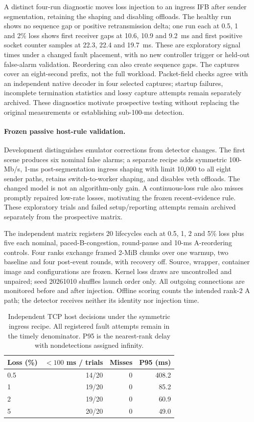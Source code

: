 \documentclass[sigconf]{acmart}
\begin{document}
A distinct four-run diagnostic moves loss injection to an ingress IFB
after sender segmentation, retaining the shaping and disabling offloads.
The healthy run shows no sequence gap or positive retransmission delta;
one run each at 0.5, 1 and 2\% loss shows first receiver gaps at
10.6, 10.9 and 9.2~ms and first positive socket counter samples at
22.3, 22.4 and 19.7~ms. These are exploratory signal times under a
changed fault placement, with no new controller trigger or held-out
false-alarm validation. Reordering can also create sequence gaps.
The captures cover an eight-second prefix, not the full workload.
Packet-field checks agree with an independent native decoder in four
selected captures; startup failures, incomplete termination statistics
and lossy capture attempts remain separately archived. These diagnostics
motivate prospective testing without replacing the original measurements
or establishing sub-100-ms detection.

\paragraph{Frozen passive host-rule validation.}
Development distinguishes emulator corrections from detector changes.
The first scene produces six nominal false alarms; a separate recipe
adds symmetric 100-Mb/s, 1-ms post-segmentation ingress shaping with
limit 10,000 to all eight sender paths, retains switch-to-worker
shaping, and disables veth offloads. The changed model is not an
algorithm-only gain. A continuous-loss rule also misses promptly
repaired low-rate losses, motivating the frozen recent-evidence rule.
These exploratory trials and failed setup/reporting attempts remain
archived separately from the prospective matrix.

The independent matrix registers 20 lifecycles each at 0.5, 1, 2 and
5\% loss plus five each nominal, paced-B-congestion, round-pause and
10-ms A-reordering controls. Four ranks exchange framed 2-MiB chunks
over one warmup, two baseline and four post-event rounds, with recovery
off. Source, wrapper, container image and configurations are frozen.
Kernel loss draws are uncontrolled and unpaired; seed 20261010
shuffles launch order only. All outgoing connections are monitored
before and after injection. Offline scoring counts the intended rank-2
A path; the detector receives neither its identity nor injection time.

\begin{table}[t]
\caption{Independent TCP host decisions under the symmetric ingress recipe.
All registered fault attempts remain in the timely denominator. P95 is the
nearest-rank delay with nondetections assigned infinity.}
\label{tab:tcp-host-validation}
\centering
\small
\begin{tabular}{@{}lrrr@{}}
\toprule
Loss (\%) & $<100$ ms / trials & Misses & P95 (ms) \\
\midrule
0.5 & 14/20 & 0 & 408.2 \\
1 & 19/20 & 0 & 85.2 \\
2 & 19/20 & 0 & 60.9 \\
5 & 20/20 & 0 & 49.0 \\
\bottomrule
\end{tabular}
\end{table}
\end{document}
